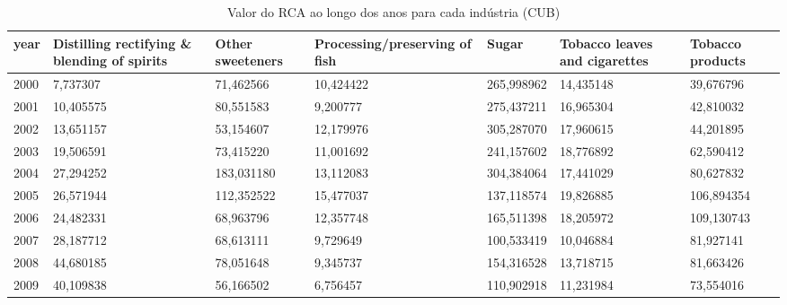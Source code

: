 \begin{table}
\centering
\caption{Valor do RCA ao longo dos anos para cada indústria (CUB)}
\begin{tabular}{p{1cm}p{2cm}p{2cm}p{2cm}p{2cm}p{2cm}p{2cm}}
\toprule
 year &  Distilling rectifying \& blending of spirits &  Other sweeteners &  Processing/preserving of fish &      Sugar &  Tobacco leaves and cigarettes &  Tobacco products \\
\midrule
 2000 &                                     7,737307 &         71,462566 &                      10,424422 & 265,998962 &                      14,435148 &         39,676796 \\
 2001 &                                    10,405575 &         80,551583 &                       9,200777 & 275,437211 &                      16,965304 &         42,810032 \\
 2002 &                                    13,651157 &         53,154607 &                      12,179976 & 305,287070 &                      17,960615 &         44,201895 \\
 2003 &                                    19,506591 &         73,415220 &                      11,001692 & 241,157602 &                      18,776892 &         62,590412 \\
 2004 &                                    27,294252 &        183,031180 &                      13,112083 & 304,384064 &                      17,441029 &         80,627832 \\
 2005 &                                    26,571944 &        112,352522 &                      15,477037 & 137,118574 &                      19,826885 &        106,894354 \\
 2006 &                                    24,482331 &         68,963796 &                      12,357748 & 165,511398 &                      18,205972 &        109,130743 \\
 2007 &                                    28,187712 &         68,613111 &                       9,729649 & 100,533419 &                      10,046884 &         81,927141 \\
 2008 &                                    44,680185 &         78,051648 &                       9,345737 & 154,316528 &                      13,718715 &         81,663426 \\
 2009 &                                    40,109838 &         56,166502 &                       6,756457 & 110,902918 &                      11,231984 &         73,554016 \\

\end{tabular}
\end{table}

